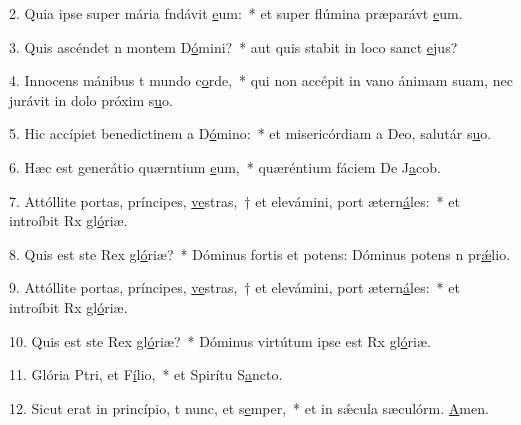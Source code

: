 2. Quia ipse super mária fndávit \uline{e}um:~* et super flúmina præparávt \uline{e}um.\par 
3. Quis ascéndet n montem D\uline{ó}mini?~* aut quis stabit in loco sanct \uline{e}jus?\par 
4. Innocens mánibus t mundo c\uline{o}rde,~* qui non accépit in vano ánimam suam, nec jurávit in dolo próxim s\uline{u}o.\par 
5. Hic accípiet benedictinem a D\uline{ó}mino:~* et misericórdiam a Deo, salutár s\uline{u}o.\par 
6. Hæc est generátio quærntium \uline{e}um,~* quæréntium fáciem De J\uline{a}cob.\par 
7. Attóllite portas, príncipes, \uline{ve}stras,~† et elevámini, port ætern\uline{á}les:~* et introíbit Rx gl\uline{ó}riæ.\par 
8. Quis est ste Rex gl\uline{ó}riæ?~* Dóminus fortis et potens: Dóminus potens n pr\uline{ǽ}lio.\par 
9. Attóllite portas, príncipes, \uline{ve}stras,~† et elevámini, port ætern\uline{á}les:~* et introíbit Rx gl\uline{ó}riæ.\par 
10. Quis est ste Rex gl\uline{ó}riæ?~* Dóminus virtútum ipse est Rx gl\uline{ó}riæ.\par 
11. Glória Ptri, et F\uline{í}lio,~* et Spirítu S\uline{a}ncto.\par 
12. Sicut erat in princípio, t nunc, et s\uline{e}mper,~* et in sǽcula sæculórm. \uline{A}men.\par 
